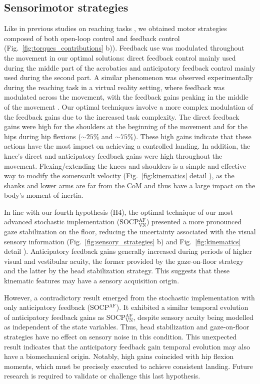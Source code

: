 \documentclass[10pt,letterpaper]{article}
\newcommand*\circled[1]{\tikz[baseline=(char.base)]{
            \node[shape=circle,draw,inner sep=2pt] (char) {#1};}}
\begin{document}
\subsection{Sensorimotor strategies}
Like in previous studies on reaching tasks \cite{van2022approximate, yeo2016optimal}, we obtained motor strategies composed of both open-loop control and feedback control (Fig.~\ref{fig:torques_contributions} b)).
Feedback use was modulated throughout the movement in our optimal solutions: direct feedback control mainly used during the middle part of the acrobatics and anticipatory feedback control mainly used during the second part.
A similar phenomenon was observed experimentally during the reaching task in a virtual reality setting, where feedback was modulated across the movement, with the feedback gains peaking in the middle of the movement \cite{dimitriou2013temporal}.
Our optimal techniques involve a more complex modulation of the feedback gains due to the increased task complexity.
The direct feedback gains were high for the shoulders at the beginning of the movement and for the hips during hip flexions ($\sim 25\%$ and $\sim 75\%$). 
These high gains indicate that these actions have the most impact on achieving a controlled landing.
In addition, the knee's direct and anticipatory feedback gains were high throughout the movement.
Flexing/extending the knees and shoulders is a simple and effective way to modify the somersault velocity (Fig.~\ref{fig:kinematics} detail \circled{4}), as the shanks and lower arms are far from the CoM and thus have a large impact on the body's moment of inertia.

In line with our fourth hypothesis (H4), the optimal technique of our most advanced stochastic implementation (SOCP$_{\text{VN}}^{\text{AF}}$) presented a more pronounced gaze stabilization on the floor, reducing the uncertainty associated with the visual sensory information (Fig.~\ref{fig:sensory_strategies} b) and Fig.~\ref{fig:kinematics} detail \circled{4}).
Anticipatory feedback gains generally increased during periods of higher visual and vestibular acuity, the former provided by the gaze-on-floor strategy and the latter by the head stabilization strategy. This suggests that these kinematic features may have a sensory acquisition origin.

However, a contradictory result emerged from the stochastic implementation with only anticipatory feedback (SOCP$^{\text{AF}}$).
It exhibited a similar temporal evolution of anticipatory feedback gains as SOCP$_{\text{VN}}^{\text{AF}}$, despite sensory acuity being modelled as independent of the state variables.
Thus, head stabilization and gaze-on-floor strategies have no effect on sensory noise in this condition. 
This unexpected result indicates that the anticipatory feedback gain temporal evolution may also have a biomechanical origin. 
Notably, high gains coincided with hip flexion moments, which must be precisely executed to achieve consistent landing.
Future research is required to validate or challenge this last hypothesis.
\end{document}
